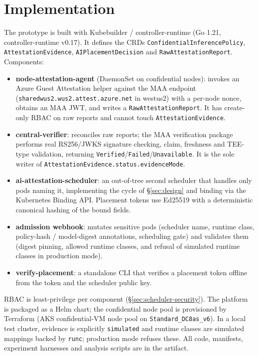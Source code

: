 \section{Implementation}
\label{sec:implementation}

The prototype is built with Kubebuilder / controller-runtime (Go 1.21,
controller-runtime v0.17). It defines the CRDs
\texttt{ConfidentialInferencePolicy}, \texttt{AttestationEvidence},
\texttt{AIPlacementDecision} and \texttt{RawAttestationReport}. Components:

\begin{itemize}
  \item \textbf{node-attestation-agent} (DaemonSet on confidential nodes): invokes
  an Azure Guest Attestation helper against the MAA endpoint
  (\texttt{sharedwus2.wus2.attest.azure.net} in westus2) with a per-node nonce,
  obtains an MAA JWT, and writes a \texttt{RawAttestationReport}. It has
  create-only RBAC on raw reports and cannot touch \texttt{AttestationEvidence}.
  \item \textbf{central-verifier}: reconciles raw reports; the MAA verification
  package performs real RS256/JWKS signature checking, claim, freshness and
  TEE-type validation, returning \texttt{Verified}/\texttt{Failed}/\texttt{Unavailable}.
  It is the sole writer of \texttt{AttestationEvidence.status.evidenceMode}.
  \item \textbf{ai-attestation-scheduler}: an out-of-tree second scheduler that
  handles only pods naming it, implementing the cycle of \S\ref{sec:design} and
  binding via the Kubernetes Binding API. Placement tokens use Ed25519 with a
  deterministic canonical hashing of the bound fields.
  \item \textbf{admission webhook}: mutates sensitive pods (scheduler name,
  runtime class, policy-hash / model-digest annotations, scheduling gate) and
  validates them (digest pinning, allowed runtime classes, and refusal of
  simulated runtime classes in production mode).
  \item \textbf{verify-placement}: a standalone CLI that verifies a placement
  token offline from the token and the scheduler public key.
\end{itemize}

RBAC is least-privilege per component (\S\ref{sec:scheduler-security}). The
platform is packaged as a Helm chart; the confidential node pool is provisioned
by Terraform (AKS confidential-VM node pool on \texttt{Standard\_DC8as\_v6}). In
a local test cluster, evidence is explicitly \texttt{simulated} and
runtime classes are simulated mappings backed by \texttt{runc}; production mode
refuses these. All code, manifests, experiment harnesses and analysis scripts are
in the artifact.
